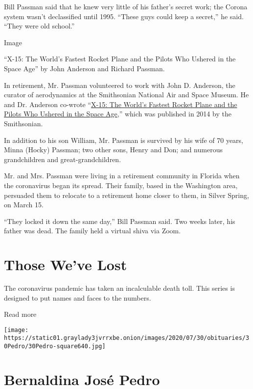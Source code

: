 Bill Passman said that he knew very little of his father's secret work;
the Corona system wasn't declassified until 1995. ``These guys could
keep a secret,'' he said. ``They were old school.''

Image

``X-15: The World's Fastest Rocket Plane and the Pilots Who Ushered in
the Space Age'' by John Anderson and Richard Passman.

In retirement, Mr. Passman volunteered to work with John D. Anderson,
the curator of aerodynamics at the Smithsonian National Air and Space
Museum. He and Dr. Anderson co-wrote
``\href{https://www.thespacereview.com/article/2448/1}{X-15: The World's
Fastest Rocket Plane and the Pilots Who Ushered in the Space Age},''
which was published in 2014 by the Smithsonian.

In addition to his son William, Mr. Passman is survived by his wife of
70 years, Minna (Hocky) Passman; two other sons, Henry and Don; and
numerous grandchildren and great-grandchildren.

Mr. and Mrs. Passman were living in a retirement community in Florida
when the coronavirus began its spread. Their family, based in the
Washington area, persuaded them to relocate to a retirement home closer
to them, in Silver Spring, on March 15.

``They locked it down the same day,'' Bill Passman said. Two weeks
later, his father was dead. The family held a virtual shiva via Zoom.

\href{https://www.nytimes3xbfgragh.onion/interactive/2020/obituaries/people-died-coronavirus-obituaries.html?action=click\&pgtype=Article\&state=default\&region=BELOW_MAIN_CONTENT\&context=covid_obits_promo}{}

\hypertarget{those-weve-lost}{%
\section{Those We've Lost}\label{those-weve-lost}}

The coronavirus pandemic has taken an incalculable death toll. This
series is designed to put names and faces to the numbers.

Read more

\texttt{[image: https://static01.graylady3jvrrxbe.onion/images/2020/07/30/obituaries/30Pedro/30Pedro-square640.jpg]}

\hypertarget{bernaldina-josuxe9-pedro}{%
\section{Bernaldina José Pedro}\label{bernaldina-josuxe9-pedro}}

